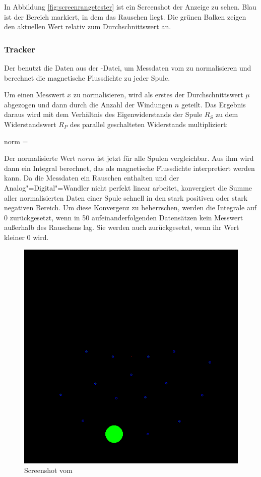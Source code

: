 In Abbildung \ref{fig:screenrangetester} ist ein Screenshot der Anzeige zu sehen.
Blau ist der Bereich markiert, in dem das Rauschen liegt.
Die grünen Balken zeigen den aktuellen Wert relativ zum Durchschnittswert an.

\subsubsection{Tracker}
Der  benutzt die Daten aus der -Datei, um Messdaten vom  zu normalisieren und berechnet die magnetische Flussdichte zu jeder Spule.

Um einen Messwert $x$ zu normalisieren, wird als erstes der Durchschnittswert $\mu$ abgezogen und dann durch die Anzahl der Windungen $n$ geteilt.
Das Ergebnis daraus wird mit dem Verhältnis des Eigenwiderstands der Spule $R_S$ zu dem Widerstandswert $R_P$ des parallel geschalteten Widerstands multipliziert:

\mathematik
norm =  \cdot {}
\mathematikstop

Der normalisierte Wert $norm$ ist jetzt für alle Spulen vergleichbar.
Aus ihm wird dann ein Integral berechnet, das als magnetische Flussdichte interpretiert werden kann.
Da die Messdaten ein Rauschen enthalten und der Analog"=Digital"=Wandler nicht perfekt linear arbeitet, konvergiert die Summe aller normalisierten Daten einer Spule schnell in den stark positiven oder stark negativen Bereich.
Um diese Konvergenz zu beherrschen, werden die Integrale auf 0 zurückgesetzt, wenn in 50  aufeinanderfolgenden Datensätzen kein Messwert außerhalb des Rauschens lag.
Sie werden auch zurückgesetzt, wenn ihr Wert kleiner 0 wird.

\begin{figure}[hbt]
  \centering
  \includegraphics[width=\textwidth]{images/tracker.png}
  \caption{Screenshot vom }
  \label{fig:screentracker}
\end{figure}

